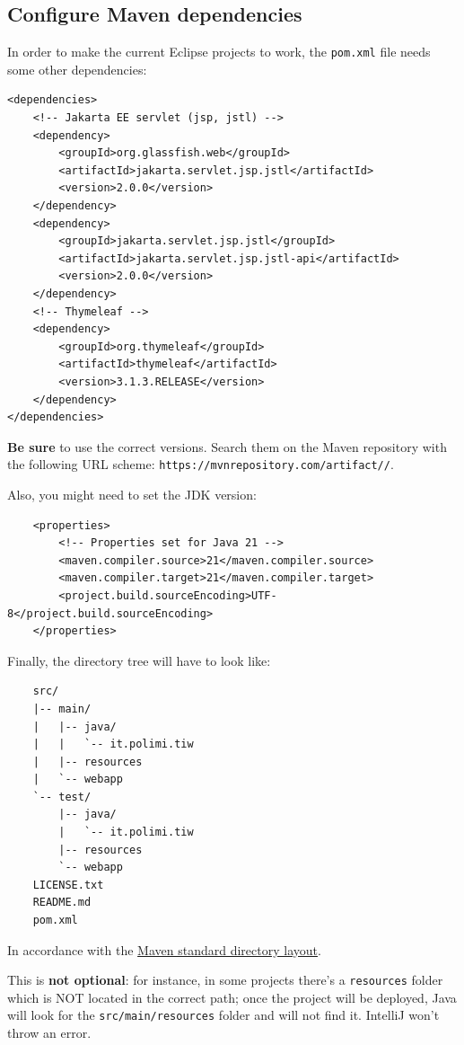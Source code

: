 \subsection{Configure Maven dependencies}

In order to make the current Eclipse projects to work, the \texttt{pom.xml} file needs some other dependencies:
\begin{verbatim}
<dependencies>
    <!-- Jakarta EE servlet (jsp, jstl) -->
    <dependency>
        <groupId>org.glassfish.web</groupId>
        <artifactId>jakarta.servlet.jsp.jstl</artifactId>
        <version>2.0.0</version>
    </dependency>
    <dependency>
        <groupId>jakarta.servlet.jsp.jstl</groupId>
        <artifactId>jakarta.servlet.jsp.jstl-api</artifactId>
        <version>2.0.0</version>
    </dependency>
    <!-- Thymeleaf -->
    <dependency>
        <groupId>org.thymeleaf</groupId>
        <artifactId>thymeleaf</artifactId>
        <version>3.1.3.RELEASE</version>
    </dependency>
</dependencies>
\end{verbatim}

\textbf{Be sure} to use the correct versions. Search them on the Maven repository with the following URL scheme: \texttt{https://mvnrepository.com/artifact//}.

Also, you might need to set the JDK version:
\begin{verbatim}
    <properties>
        <!-- Properties set for Java 21 -->
        <maven.compiler.source>21</maven.compiler.source>
        <maven.compiler.target>21</maven.compiler.target>
        <project.build.sourceEncoding>UTF-8</project.build.sourceEncoding>
    </properties>
\end{verbatim}

\begin{warning}{}
  Finally, the directory tree will have to look like:
    \begin{verbatim}
    src/
    |-- main/
    |   |-- java/
    |   |   `-- it.polimi.tiw
    |   |-- resources
    |   `-- webapp
    `-- test/
        |-- java/
        |   `-- it.polimi.tiw
        |-- resources
        `-- webapp
    LICENSE.txt
    README.md
    pom.xml
    \end{verbatim}

  In accordance with the \href{https://maven.apache.org/guides/introduction/introduction-to-the-standard-directory-layout.html}{Maven standard directory layout}.

  This is \textbf{not optional}: for instance, in some projects there's a \texttt{resources} folder which is NOT located in the correct path; once the project will be deployed, Java will look for the \texttt{src/main/resources} folder and will not find it. IntelliJ won't throw an error.
\end{warning}
